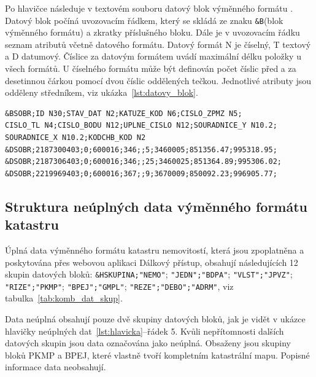Po hlavičce následuje v textovém souboru  datový blok
výměnného formátu . Datový blok počíná uvozovacím řádkem,
který se skládá ze znaku \verb|&B|(blok výměnného formátu) a zkratky
příslušného bloku. Dále je v uvozovacím řádku seznam atributů včetně
datového formátu. Datový formát N je číselný, T textový a D
datumový. Číslice za datovým formátem uvádí maximální délku položky u
všech formátů. U číselného formátu může být definován počet číslic
před a za desetinnou čárkou pomocí dvou číslic oddělených
tečkou. Jednotlivé atributy jsou odděleny středníkem, viz
ukázka~\ref{lst:datovy_blok}.

{\small
\begin{lstlisting}[caption=Ukázka datového bloku SOBR(souřadnice obrazu bodů polohopisu v mapě) neúplných dat, label=lst:datovy_blok]
&BSOBR;ID N30;STAV_DAT N2;KATUZE_KOD N6;CISLO_ZPMZ N5;
CISLO_TL N4;CISLO_BODU N12;UPLNE_CISLO N12;SOURADNICE_Y N10.2;
SOURADNICE_X N10.2;KODCHB_KOD N2
&DSOBR;2187300403;0;600016;346;;5;3460005;851356.47;995318.95;
&DSOBR;2187306403;0;600016;346;;25;3460025;851364.89;995306.02;
&DSOBR;2219969403;0;600016;367;;9;3670009;850092.23;996905.77;
\end{lstlisting}}

\subsection{Struktura neúplných data výměnného formátu katastru}
\label{subsec:neuplna_data}
Úplná data výměnného formátu katastru nemovitostí, která jsou
zpoplatněna a poskytována přes webovou aplikaci Dálkový přístup,
obsahují následujících 12 skupin datových bloků:
\verb|&HSKUPINA;"NEMO"|; \verb|"JEDN";"BDPA"|; \verb|"VLST";"JPVZ"|;
\verb|"RIZE";"PKMP"|; \verb|"BPEJ";"GMPL"|;
\verb|"REZE";"DEBO";"ADRM"|, viz tabulka~\ref{tab:komb_dat_skup}.

Data neúplná obsahují pouze dvě skupiny datových bloků, jak je vidět v
ukázce hlavičky neúplných dat~\ref{lst:hlavicka}--řádek 5. Kvůli
nepřítomnosti dalších datových skupin jsou data označována jako
neúplná. Obsaženy jsou skupiny bloků PKMP a BPEJ, které vlastně tvoří
kompletním katastrální mapu. Popisné informace data neobsahují.

